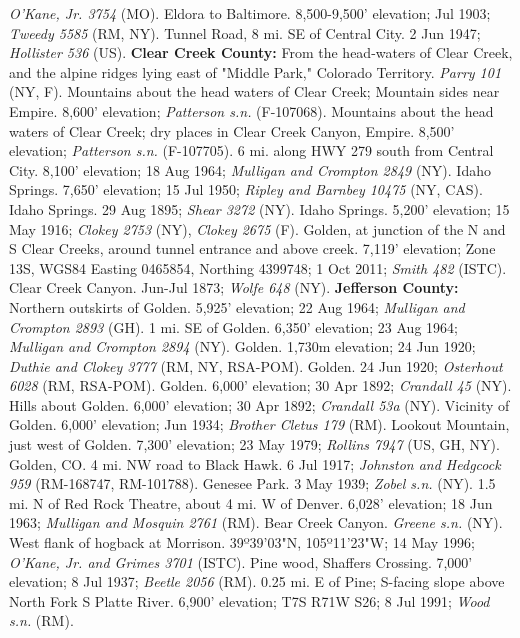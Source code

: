 \textit{O'Kane, Jr. 3754} (MO).
Eldora to Baltimore. 8,500-9,500' elevation; Jul 1903;
\textit{Tweedy 5585} (RM, NY).
Tunnel Road, 8 mi. SE of Central City. 2 Jun 1947; \textit{Hollister 536} (US).
  \textbf{Clear Creek County:}
From the head-waters of Clear Creek, and the alpine ridges lying east of
"Middle Park," Colorado Territory. \textit{Parry 101} (NY, F).
Mountains about the head waters of Clear Creek; Mountain sides near Empire.
8,600' elevation; \textit{Patterson s.n.} (F-107068).
Mountains about the head waters of Clear Creek; dry places in Clear Creek
Canyon, Empire. 8,500' elevation; \textit{Patterson s.n.} (F-107705).
6 mi. along HWY 279 south from Central City. 8,100' elevation; 18 Aug 1964;
\textit{Mulligan and Crompton 2849} (NY).
Idaho Springs. 7,650' elevation; 15 Jul 1950;
\textit{Ripley and Barnbey 10475} (NY, CAS).
Idaho Springs. 29 Aug 1895; \textit{Shear 3272} (NY).
Idaho Springs. 5,200' elevation; 15 May 1916;
\textit{Clokey 2753} (NY), \textit{Clokey 2675} (F).
Golden, at junction of the N and S Clear Creeks, around tunnel entrance and
above creek. 7,119' elevation; Zone 13S, WGS84 Easting 0465854,
Northing 4399748; 1 Oct 2011; \textit{Smith 482} (ISTC).
Clear Creek Canyon. Jun-Jul 1873; \textit{Wolfe 648} (NY).
  \textbf{Jefferson County:}
Northern outskirts of Golden. 5,925' elevation; 22 Aug 1964;
\textit{Mulligan and Crompton 2893} (GH).
1 mi. SE of Golden. 6,350' elevation; 23 Aug 1964;
\textit{Mulligan and Crompton 2894} (NY).
Golden. 1,730m elevation; 24 Jun 1920;
\textit{Duthie and Clokey 3777} (RM, NY, RSA-POM).
Golden. 24 Jun 1920; \textit{Osterhout 6028} (RM, RSA-POM).
Golden. 6,000' elevation; 30 Apr 1892; \textit{Crandall 45} (NY).
Hills about Golden. 6,000' elevation; 30 Apr 1892; \textit{Crandall 53a} (NY).
Vicinity of Golden. 6,000' elevation; Jun 1934;
\textit{Brother Cletus 179} (RM).
Lookout Mountain, just west of Golden. 7,300' elevation; 23 May 1979;
\textit{Rollins 7947} (US, GH, NY).
Golden, CO. 4 mi. NW road to Black Hawk. 6 Jul 1917;
\textit{Johnston and Hedgcock 959} (RM-168747, RM-101788).
Genesee Park. 3 May 1939; \textit{Zobel s.n.} (NY).
1.5 mi. N of Red Rock Theatre, about 4 mi. W of Denver. 6,028' elevation;
18 Jun 1963; \textit{Mulligan and Mosquin 2761} (RM).
Bear Creek Canyon. \textit{Greene s.n.} (NY).
West flank of hogback at Morrison. 39º39'03"N, 105º11'23"W;
14 May 1996; \textit{O'Kane, Jr. and Grimes 3701} (ISTC).
Pine wood, Shaffers Crossing. 7,000' elevation; 8 Jul 1937;
\textit{Beetle 2056} (RM).
0.25 mi. E of Pine; S-facing slope above North Fork S Platte River.
6,900' elevation; T7S R71W S26; 8 Jul 1991; \textit{Wood s.n.} (RM).
